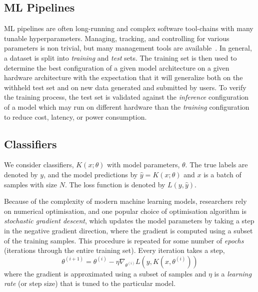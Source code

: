\documentclass[conference]{IEEEtran}
\begin{document}
\subsection{ML Pipelines}
ML pipelines are often long-running and complex software tool-chains with many tunable hyperparameters. Managing, tracking, and controlling for various parameters is non trivial, but many management tools are available~\cite{dvc,hydra,k8s}. In general, a dataset is split into \textit{training} and \textit{test} sets. The training set is then used to determine the best configuration of a given model architecture on a given hardware architecture with the expectation that it will generalize both on the withheld test set and on new data generated and submitted by users. To verify the training process, the test set is validated against the \textit{inference} configuration of a model which may run on different hardware than the \textit{training} configuration to reduce cost, latency, or power consumption. 

\subsection{Classifiers}

We consider classifiers, $K(x; \theta)$ with model parameters, $\theta$. The true labels are denoted by $y$, and the model predictions by $\hat{y} = K(x; \theta)$ and $x$ is a batch of samples with size $N$. The loss function is denoted by $L(y, \hat{y})$.

Because of the complexity of modern machine learning models, researchers rely on numerical optimisation, and one popular choice of optimisation algorithm is \textit{stochastic gradient descent}, which updates the model parameters by taking a step in the negative gradient direction, where the gradient is computed using a subset of the training samples.
This procedure is repeated for some number of \textit{epochs} (iterations through the entire training set). Every iteration takes a step,
\begin{equation}
    \theta^{(i+1)} = \theta^{(i)} - \eta \nabla_{\theta^{(i)}} L(y, K(x, \theta^{(i)}))
    \label{eq:sgd}
\end{equation}
where the gradient is approximated using a subset of samples and $\eta$ is a \textit{learning rate} (or step size) that is tuned to the particular model.
\end{document}

